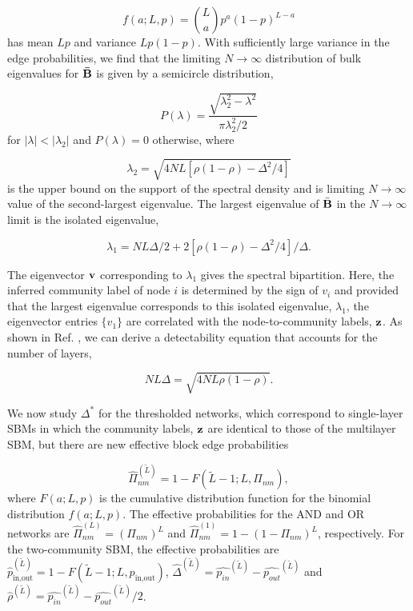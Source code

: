 \begin{equation}
f(a;L,p)={L \choose a}p^{a}(1-p)^{L-a}
\end{equation}
has mean $Lp$ and variance $Lp(1-p)$. With sufficiently large variance in the edge probabilities, we find that the limiting $N\rightarrow \infty$ distribution of bulk eigenvalues for ${\bf \bar{B}}$ is given by a semicircle distribution,

\begin{equation}
P(\lambda)=\frac{\sqrt{\lambda^2_{2}-\lambda^{2}}}{\pi \lambda_{2}^{2}/2}
\end{equation}
for $|\lambda|<|\lambda_{2}|$ and $P(\lambda)=0$ otherwise, where

\begin{equation}
\lambda_{2}=\sqrt{4NL[\rho(1-\rho)-\Delta^{2}/4]}
\end{equation}
is the upper bound on the support of the spectral density and is limiting $N \rightarrow \infty$ value of the second-largest eigenvalue. The largest eigenvalue of $\bar{{\bf B}}$ in the $N \rightarrow \infty$ limit is the isolated eigenvalue,

\begin{equation}
\lambda_{1}=NL\Delta/2+2[\rho(1-\rho)-\Delta^{2}/4]/\Delta. 
\end{equation}

The eigenvector ${\bf v}$ corresponding to $\lambda_{1}$ gives the spectral bipartition. Here, the inferred community label of node $i$ is determined by the sign of $v_{i}$ and provided that the largest eigenvalue corresponds to this isolated eigenvalue, $\lambda_{1}$, the eigenvector entries $\{v_{1}\}$ are correlated with the node-to-community labels, ${\bf z}$.  As shown in Ref. \cite{taylor2015enhanced}, we can derive a detectability equation that accounts for the number of layers,

\begin{equation}
NL\Delta=\sqrt{4NL\rho(1-\rho)}.
\end{equation}

\indent We now study $\Delta^{*}$ for the thresholded networks, which correspond to single-layer SBMs in which the community labels, ${\bf z}$ are identical to those of the multilayer SBM, but there are new effective block edge probabilities

\begin{equation}
\hat{\Pi}_{nm}^{(\tilde{L})}=1-F(\tilde{L}-1;L,\Pi_{nm}),
\end{equation}
where $F(a;L,p)$ is the cumulative distribution function for the binomial distribution $f(a;L,p)$. The effective probabilities for the AND and OR networks are $\hat{\Pi}_{nm}^{(L)}=(\Pi_{nm})^{L}$ and $\hat{\Pi}_{nm}^{(1)}=1-(1-\Pi_{nm})^{L}$, respectively. For the two-community SBM, the effective probabilities are $\hat{p}_{\text{in,out}}^{(\tilde{L})}=1-F(\tilde{L}-1;L,p_{\text{in,out}})$, $\hat{\Delta}^{(\tilde{L})}=\hat{p_{in}}^{(\tilde{L})}-\hat{p_{out}}^{(\tilde{L})}$ and $\hat{\rho}^{(\tilde{L})}=\hat{p_{in}}^{(\tilde{L})}-\hat{p_{out}}^{(\tilde{L})}/2$. 

